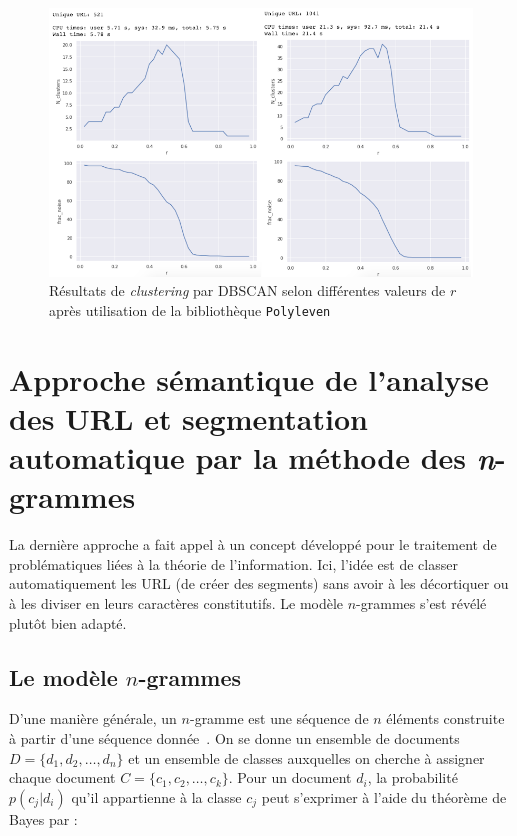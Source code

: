 \documentclass[11pt, a4paper]{article}
\begin{document}
\begin{figure}[!h]
	\center
	\includegraphics[scale=2.1]{polyleven.png}
	\caption{Résultats de \textit{clustering} par DBSCAN selon différentes valeurs de $r$ après utilisation de la bibliothèque \texttt{Polyleven}}
	\label{polyleven}
\end{figure}

\newpage
\section{Approche sémantique de l'analyse des URL et segmentation automatique par la méthode des \textit{n}-grammes}

La dernière approche a fait appel à un concept développé pour le traitement de problématiques liées à la théorie de l'information. Ici, l'idée est de classer automatiquement les URL (de créer des segments) sans avoir à les décortiquer ou à les diviser en leurs caractères constitutifs. Le modèle $n$-grammes s'est révélé plutôt bien adapté.

\subsection{Le modèle $n$-grammes}

D'une manière générale, un $n$-gramme est une séquence de $n$ éléments construite à partir d'une séquence donnée~\cite{abdallah}. On se donne un ensemble de documents $D = \{d_1, d_2, \dots, d_n\}$ et un ensemble de classes auxquelles on cherche à assigner chaque document $C = \{c_1, c_2, \dots, c_k\}$. Pour un document $d_i$, la probabilité $p(c_j|d_i)$ qu'il appartienne à la classe $c_j$ peut s'exprimer à l'aide du théorème de Bayes par :
\end{document}
